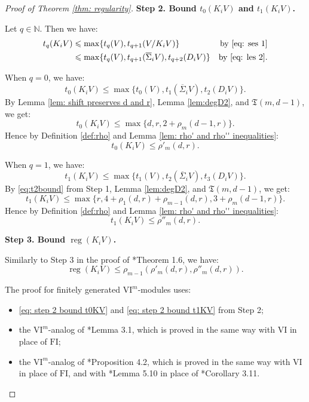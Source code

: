 \documentclass{amsart}
\numberwithin{equation}{section}
\DeclareMathOperator{\reg}{reg}
\newcommand{\N}{{\mathbb{N}}}
\newcommand{\VI}{{\mathrm{VI}}}
\newcommand{\FI}{{\mathrm{FI}}}
\newcommand{\SSigma}{{\overline{\Sigma}}}
\begin{document}
\begin{proof}[Proof of Theorem \ref{thm: regularity}]
   \bigskip 

   {\bf Step 2. Bound $t_0(K_i V)$ and $t_1(K_i V)$.}

   \medskip 
   
   Let $q\in \N$. Then we have:
   \begin{align*}
      t_q(K_i V)  &\leqslant \max\{ t_q(V), t_{q+1}(V/K_i V) \} & \mbox{by \eqref{eq: ses 1}} \\
      &\leqslant \max\{ t_q(V), t_{q+1}(\SSigma_i V), t_{q+2}(D_i V) \} & \mbox{by \eqref{eq: les 2}}. 
   \end{align*}

   When $q=0$, we have:
   \[  t_0(K_i V) \leqslant \max\{ t_0(V), t_1(\SSigma_i V), t_2(D_i V) \}. \]
   By Lemma \ref{lem: shift preserves d and r}, Lemma \ref{lem:degD2}, and $\mathfrak{T}(m, d-1)$, we get:
   \[ t_0(K_i V)  \leqslant \max\{ d, r, 2+\rho_m(d-1, r) \}. \]
   Hence by Definition \ref{def:rho} and Lemma \ref{lem: rho' and rho'' inequalities}:
   \begin{equation} \label{eq: step 2 bound t0KV}
      t_0(K_i V)  \leqslant \rho'_m(d, r). 
   \end{equation}

   When $q=1$, we have:
   \[ t_1(K_i V) \leqslant \max\{ t_1(V), t_2(\SSigma_i V), t_3(D_i V) \}. \]
   By \eqref{eq:t2bound} from Step 1, Lemma \ref{lem:degD2}, and $\mathfrak{T}(m, d-1)$, we get:
   \[  t_1(K_i V) \leqslant  \max\{ r, 4+\rho_1(d,r)+\rho_{m-1}(d,r), 3+\rho_m(d-1, r) \}. \]
   Hence by Definition \ref{def:rho} and Lemma \ref{lem: rho' and rho'' inequalities}:
   \begin{equation} \label{eq: step 2 bound t1KV}
      t_1(K_i V) \leqslant \rho''_m(d, r).
   \end{equation}


   \bigskip 

   {\bf Step 3. Bound $\reg(K_i V)$.}

   \medskip 

   Similarly to Step 3 in the proof of \cite{gta}*{Theorem 1.6}, we have: 
     \begin{equation} \label{eq:bound reg of KV}
      \reg(K_i V) \leqslant \rho_{m-1}(\rho'_m(d,r), \rho''_m(d,r)). 
   \end{equation}

   The proof for finitely generated $\VI^m$-modules uses:
   \begin{itemize}
      \item \eqref{eq: step 2 bound t0KV} and \eqref{eq: step 2 bound t1KV} from Step 2;
      \item the $\VI^m$-analog of \cite{gta}*{Lemma 3.1}, which is proved in the same way with $\VI$ in place of $\FI$;
      \item the $\VI^m$-analog of \cite{gta}*{Proposition 4.2}, which is proved in the same way with $\VI$ in place of $\FI$, and with \cite{na}*{Lemma 5.10} in place of \cite{gta}*{Corollary 3.11}.
   \end{itemize} 



\end{proof}
\end{document}
